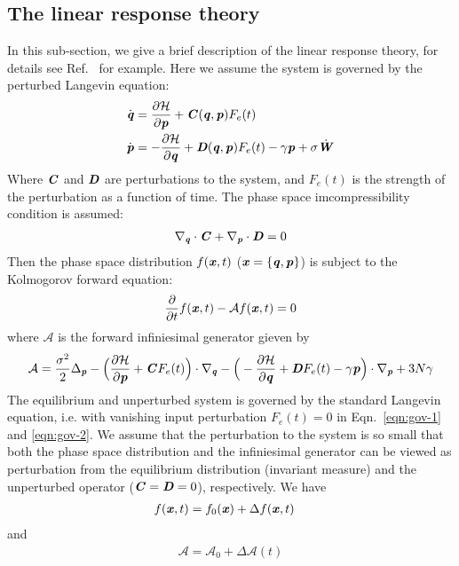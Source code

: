 \documentclass[aip,jcp,a4paper,reprint,onecolumn]{revtex4-1}
\newcommand{\vect}[1]{\textbf{\textit{#1}}}
\newcommand{\mh}{\mathcal H}
\newcommand{\fwg}{{\mathcal A}}
\begin{document}
\subsection{The linear response theory}
In this sub-section, we give a brief description of the linear response
theory, for details see Ref.~\cite{tuckeman2010statistical} for
example. Here we assume the system is governed by the
perturbed Langevin equation:
\begin{align}\label{eqn:gov-1}
  \dot{\vect q} & = \frac{\partial\mh}{\partial \vect p}
  + \vect C(\vect q,\vect p) F_e(t)\\\label{eqn:gov-2}
  \dot{\vect p} & =- \frac{\partial\mh}{\partial \vect q}
  + \vect D(\vect q,\vect p) F_e(t)
  - \gamma\vect p
  + \sigma\dot{\vect W}
\end{align}
Where $\vect C$ and $\vect D$ are perturbations to the system, and
$F_e(t)$ is the strength of the perturbation as a function of time.
The phase space imcompressibility condition is assumed:
\begin{align}
  \nabla_{\vect q}\cdot\vect C + \nabla_{\vect p}\cdot\vect D = 0
\end{align}
Then the phase space distribution $f(\vect x, t)$ ($\vect x = \{\vect
q, \vect p\}$) is subject to the Kolmogorov forward equation:
\begin{align}
  \frac{\partial}{\partial t} f(\vect x, t) - \fwg f(\vect x, t) = 0
\end{align}
where $\fwg$ is the forward infiniesimal generator gieven by
\begin{align}
  \fwg =
  \frac{\sigma^2}2\Delta_{\vect p}
  - \Big(
  \frac{\partial \mh}{\partial\vect p} + \vect C F_e(t)
  \Big)\cdot\nabla_{\vect q}
  - \Big(
  -\frac{\partial \mh}{\partial\vect q} +
  \vect D F_e(t) - \gamma\vect p
  \Big)\cdot\nabla_{\vect p}
  + 3N\gamma
\end{align}
The equilibrium and unperturbed system
is governed by
the standard Langevin equation, i.e. with
vanishing input perturbation $F_e(t) = 0$ in
Eqn.~\eqref{eqn:gov-1} and \eqref{eqn:gov-2}.
We assume that the perturbation to the
system is so small that both the phase space distribution and the
infiniesimal generator can be viewed as perturbation from the equilibrium
distribution (invariant measure) and the unperturbed operator
($\vect C = \vect D = 0$),
respectively. We have
\begin{align}
  f(\vect x, t) &= f_0(\vect x) + \Delta  f(\vect x, t)
\end{align}
and 
\begin{align}
  \fwg = \fwg_0 + \Delta\fwg(t)
\end{align}
\end{document}

